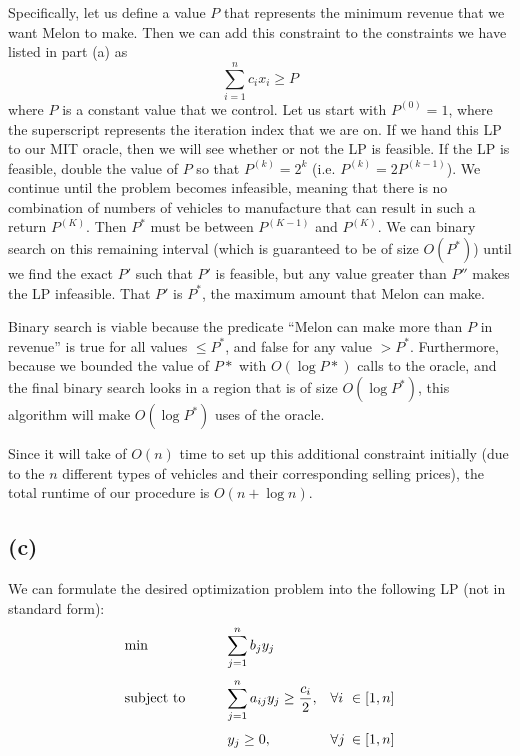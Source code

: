 \documentclass{6046}
\begin{document}
Specifically, let us define a value $P$ that represents the
minimum revenue that we want Melon to make. Then we can add
this constraint to the constraints we have listed in part (a)
as
\[
    \sum_{i = 1}^{n}c_ix_i \ge P
\]
where $P$ is a constant value that we control. Let us start
with $P^{(0)} = 1$, where the superscript represents the
iteration index that we are on. If we hand this LP to our
MIT oracle, then we will see whether or not the LP is feasible.
If the LP is feasible, double the value of $P$ so that
$P^{(k)} = 2^k$ (i.e. $P^{(k)} = 2P^{(k - 1)}$). We continue
until the problem becomes infeasible, meaning that there
is no combination of numbers of vehicles to manufacture that
can result in such a return $P^{(K)}$. Then $P^*$ must be
between $P^{(K - 1)}$ and $P^{(K)}$. We can binary search
on this remaining interval (which is guaranteed to be
of size $O(P^*)$) until we find the exact $P'$ such that
$P'$ is feasible, but any value greater than $P''$ makes the
LP infeasible. That $P'$ is $P^*$, the maximum amount that Melon
can make.

Binary search is viable because the predicate ``Melon can make
more than $P$ in revenue'' is true for all values $\le P^*$,
and false for any value $> P^*$. Furthermore, because we bounded
the value of $P*$ with $O(\log P*)$ calls to the oracle, and
the final binary search looks in a region that is of size
$O(\log P^*)$, this algorithm will make $O(\log P^*)$ uses of
the oracle.

Since it will take of $O(n)$ time to set up this
additional constraint initially (due to the $n$ different
types of vehicles and their corresponding selling prices),
the total runtime of our procedure is $O(n + \log n)$.

\subsection*{(c)}
We can formulate the desired optimization problem into
the following LP (not in standard form):
\begin{displaymath}
\begin{matrix*}[l]
\min              & {\displaystyle \qquad \sum_{j = 1}^{n}b_jy_j }\\
\vspace{-0.5em}\\
\text{subject to} & {\displaystyle \qquad \sum_{j = 1}^{n}a_{ij}y_j \ge \frac{c_i}{2}},
                    & \forall i           &\hspace{-0.5em}\in [1, n]\\
\vspace{-0.5em}\\
                    & \qquad y_j \ge 0,
                    & \forall j           &\hspace{-0.5em} \in [1, n]
\end{matrix*}
\end{displaymath}
\end{document}
